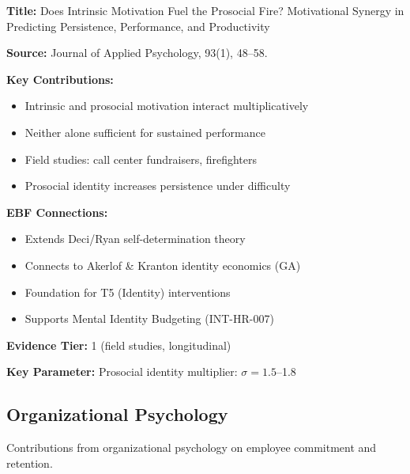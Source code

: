\begin{tcolorbox}[colback=yellow!5!white,colframe=yellow!75!black,title=Key Paper: Grant (2008)]
\textbf{Title:} Does Intrinsic Motivation Fuel the Prosocial Fire? Motivational Synergy in Predicting Persistence, Performance, and Productivity

\textbf{Source:} Journal of Applied Psychology, 93(1), 48--58.

\textbf{Key Contributions:}
\begin{itemize}
    \item Intrinsic and prosocial motivation interact multiplicatively
    \item Neither alone sufficient for sustained performance
    \item Field studies: call center fundraisers, firefighters
    \item Prosocial identity increases persistence under difficulty
\end{itemize}

\textbf{EBF Connections:}
\begin{itemize}
    \item Extends Deci/Ryan self-determination theory
    \item Connects to Akerlof \& Kranton identity economics (GA)
    \item Foundation for T5 (Identity) interventions
    \item Supports Mental Identity Budgeting (INT-HR-007)
\end{itemize}

\textbf{Evidence Tier:} 1 (field studies, longitudinal)

\textbf{Key Parameter:} Prosocial identity multiplier: $\sigma = 1.5$--1.8
\end{tcolorbox}

\subsection{Organizational Psychology}
\label{subsec:ot-organizational}

Contributions from organizational psychology on employee commitment and retention.

